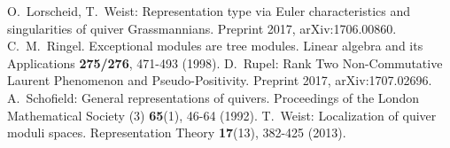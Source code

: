 \documentclass{amsart}
\numberwithin{equation}{section}
\begin{document}
\begin{thebibliography}{10}
  O.~Lorscheid, T.~Weist: Representation type via Euler characteristics and singularities of quiver Grassmannians. Preprint 2017, arXiv:1706.00860.
  C.~M.~Ringel. Exceptional modules are tree modules. Linear algebra and its Applications \textbf{275/276}, 471-493 (1998).
  D.~Rupel: Rank Two Non-Commutative Laurent Phenomenon and Pseudo-Positivity. Preprint 2017, arXiv:1707.02696.
  A.~Schofield: General representations of quivers. Proceedings of the London Mathematical Society (3) \textbf{65}(1), 46-64 (1992).
  T.~Weist: Localization of quiver moduli spaces. Representation Theory \textbf{17}(13), 382-425 (2013).
\end{thebibliography}
\end{document}
